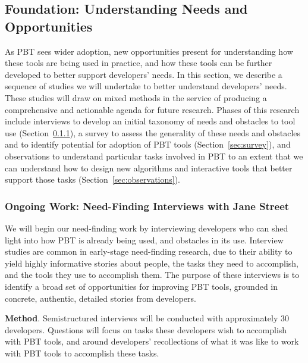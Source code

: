 

\subsection{Foundation: Understanding Needs and Opportunities }

As PBT sees wider adoption, new opportunities present for understanding how
these tools are being used in practice, and how these tools can be further
developed to better support developers' needs. In this section, we describe a
sequence of studies we will undertake to better understand developers' needs.
These studies will draw on mixed methods in the service of producing a
comprehensive and actionable agenda for future research.  Phases of this
research include interviews to develop an initial taxonomy of needs and
obstacles to tool use (Section~\ref{sec:interviews}), a survey to assess the
generality of these needs and obstacles and to identify potential for adoption
of PBT tools (Section~\ref{sec:survey}), and observations to understand
particular tasks involved in PBT to an extent that we can understand how to
design new algorithms and interactive tools that better support those tasks
(Section~\ref{sec:observations}).

\subsubsection{Ongoing Work: Need-Finding Interviews with Jane Street}
\label{sec:interviews}

We will begin our need-finding work by interviewing developers who can shed
light into how PBT is already being used, and obstacles in its use. Interview
studies are common in early-stage need-finding research, due to their ability
to yield highly informative stories about people, the tasks they need to
accomplish, and the tools they use to accomplish them. The purpose of these
interviews is to identify a broad set of opportunities for improving PBT tools,
grounded in concrete, authentic, detailed stories from developers.

\textbf{Method}. Semistructured interviews will be conducted with approximately
30 developers. Questions will focus on tasks these developers wish to accomplish
with PBT tools, and around developers' recollections of what it was like to
work with PBT tools to accomplish these tasks.

